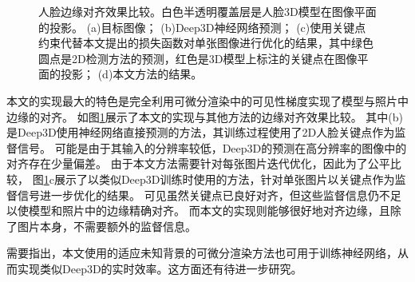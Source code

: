 \begin{figure}[tbh]
\caption[人脸边缘对齐效果比较]{
    人脸边缘对齐效果比较。白色半透明覆盖层是人脸3D模型在图像平面的投影。
    (a)目标图像；
    (b)Deep3D\citep{deep3d}神经网络预测；
    (c)使用关键点约束代替本文提出的损失函数对单张图像进行优化的结果，其中绿色圆点是2D检测方法的预测，红色是3D模型上标注的关键点在图像平面的投影；
    (d)本文方法的结果。
}
\label{fig:edge_alignment}
\end{figure}
本文的实现最大的特色是完全利用可微分渲染中的可见性梯度实现了模型与照片中边缘的对齐。
如图\ref{fig:edge_alignment}展示了本文的实现与其他方法的边缘对齐效果比较。
其中(b)是Deep3D\citep{deep3d}使用神经网络直接预测的方法，其训练过程使用了2D人脸关键点作为监督信号。
可能是由于其输入的分辨率较低，Deep3D的预测在高分辨率的图像中的对齐存在少量偏差。
由于本文方法需要针对每张图片迭代优化，因此为了公平比较，
图\ref{fig:edge_alignment}c展示了以类似Deep3D训练时使用的方法，针对单张图片以关键点作为监督信号进一步优化的结果。
可见虽然关键点已良好对齐，但这些监督信息仍不足以使模型和照片中的边缘精确对齐。
而本文的实现则能够很好地对齐边缘，且除了图片本身，不需要额外的监督信息。

需要指出，本文使用的适应未知背景的可微分渲染方法也可用于训练神经网络，从而实现类似Deep3D的实时效率。这方面还有待进一步研究。

